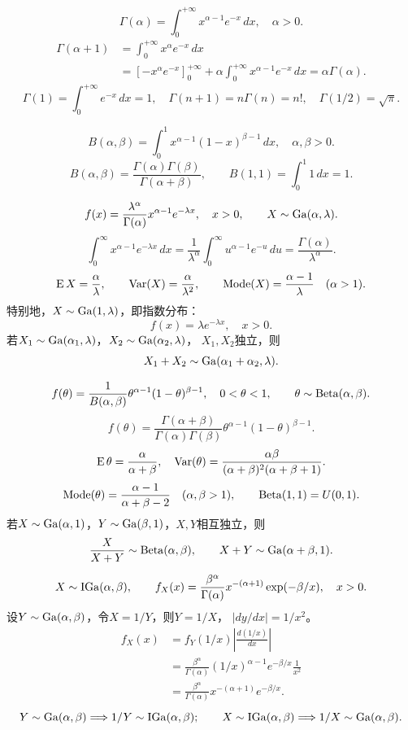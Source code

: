 \[
\Gamma(\alpha)=\int_0^{+\infty}x^{\alpha-1}e^{-x}\,dx,\quad\alpha>0.
\]
\begin{align*}
\Gamma(\alpha+1)
&=\int_0^{+\infty}x^\alpha e^{-x}\,dx\\
&=\left[-x^\alpha e^{-x}\right]_0^{+\infty}
+\alpha\int_0^{+\infty}x^{\alpha-1}e^{-x}\,dx
=\alpha\Gamma(\alpha).
\end{align*}
\[
\Gamma(1)=\int_0^{+\infty}e^{-x}\,dx=1,\quad
\Gamma(n+1)=n\Gamma(n)=n!,\quad
\Gamma(1/2)=\sqrt{\pi}.
\]

\[
B(\alpha,\beta)=\int_0^1 x^{\alpha-1}(1-x)^{\beta-1}\,dx,
\quad\alpha,\beta>0.
\]
\[
B(\alpha,\beta)=\frac{\Gamma(\alpha)\Gamma(\beta)}{\Gamma(\alpha+\beta)},
\qquad B(1,1)=\int_0^1 1\,dx=1.
\]

\[
f(x)=\frac{\lambda^\alpha}{\Gamma(\alpha)}
x^{\alpha-1}e^{-\lambda x},\quad x>0,
\qquad X\sim\operatorname{Ga}(\alpha,\lambda).
\]
\[
\int_0^\infty x^{\alpha-1}e^{-\lambda x}\,dx
=\frac1{\lambda^\alpha}\int_0^\infty u^{\alpha-1}e^{-u}\,du
=\frac{\Gamma(\alpha)}{\lambda^\alpha}.
\]
\[
\operatorname{E} X=\frac{\alpha}{\lambda},\qquad
\operatorname{Var}(X)=\frac{\alpha}{\lambda^2},\qquad
\operatorname{Mode}(X)=\frac{\alpha-1}{\lambda}\quad(\alpha>1).
\]
特别地，$X\sim\operatorname{Ga}(1,\lambda)$，即指数分布：
\[
f(x)=\lambda e^{-\lambda x},\quad x>0.
\]
若$X_1\sim\operatorname{Ga}(\alpha_1,\lambda)$，$X_2\sim\operatorname{Ga}(\alpha_2,\lambda)$，
$X_1,X_2$独立，则
\[
X_1+X_2\sim\operatorname{Ga}(\alpha_1+\alpha_2,\lambda).
\]

\[
f(\theta)=\frac1{B(\alpha,\beta)}
\theta^{\alpha-1}(1-\theta)^{\beta-1},\quad0<\theta<1,
\qquad\theta\sim\operatorname{Beta}(\alpha,\beta).
\]
\[
f(\theta)=\frac{\Gamma(\alpha+\beta)}{\Gamma(\alpha)\Gamma(\beta)}
\theta^{\alpha-1}(1-\theta)^{\beta-1}.
\]
\[
\operatorname{E}\theta=\frac{\alpha}{\alpha+\beta},\quad
\operatorname{Var}(\theta)=\frac{\alpha\beta}{(\alpha+\beta)^2(\alpha+\beta+1)}.
\]
\[
\operatorname{Mode}(\theta)=\frac{\alpha-1}{\alpha+\beta-2}
\quad(\alpha,\beta>1),\qquad \operatorname{Beta}(1,1)=U(0,1).
\]
若$X\sim\operatorname{Ga}(\alpha,1)$，$Y\sim\operatorname{Ga}(\beta,1)$，$X,Y$相互独立，则
\[
\frac{X}{X+Y}\sim\operatorname{Beta}(\alpha,\beta),\qquad
X+Y\sim\operatorname{Ga}(\alpha+\beta,1).
\]

\[
X\sim\operatorname{IGa}(\alpha,\beta),\qquad
f_X(x)=\frac{\beta^\alpha}{\Gamma(\alpha)}
x^{-(\alpha+1)}\exp(-\beta/x),\quad x>0.
\]
设$Y\sim\operatorname{Ga}(\alpha,\beta)$，令$X=1/Y$，则$Y=1/X$，
$\left|dy/dx\right|=1/x^2$。
\begin{align*}
f_X(x)
&=f_Y(1/x)\left|\frac{d(1/x)}{dx}\right|\\
&=\frac{\beta^\alpha}{\Gamma(\alpha)}
(1/x)^{\alpha-1}e^{-\beta/x}\frac1{x^2}\\
&=\frac{\beta^\alpha}{\Gamma(\alpha)}
x^{-(\alpha+1)}e^{-\beta/x}.
\end{align*}
\[
Y\sim\operatorname{Ga}(\alpha,\beta)\Longrightarrow 1/Y\sim\operatorname{IGa}(\alpha,\beta);
\qquad
X\sim\operatorname{IGa}(\alpha,\beta)\Longrightarrow 1/X\sim\operatorname{Ga}(\alpha,\beta).
\]

